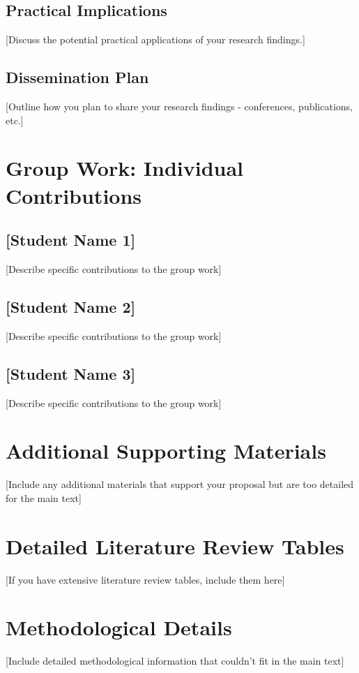 \documentclass[12pt,a4paper]{article}
\begin{document}
\subsection{Practical Implications}
[Discuss the potential practical applications of your research findings.]

\subsection{Dissemination Plan}
[Outline how you plan to share your research findings - conferences, publications, etc.]


\clearpage

\section*{Group Work: Individual Contributions}
\label{sec:contributions}

\subsection*{[Student Name 1]}
[Describe specific contributions to the group work]

\subsection*{[Student Name 2]}
[Describe specific contributions to the group work]

\subsection*{[Student Name 3]}
[Describe specific contributions to the group work]

\clearpage
{}
\printbibliography

\clearpage

\begin{appendices}
\section{Additional Supporting Materials}
[Include any additional materials that support your proposal but are too detailed for the main text]

\section{Detailed Literature Review Tables}
[If you have extensive literature review tables, include them here]

\section{Methodological Details}
[Include detailed methodological information that couldn't fit in the main text]

\end{appendices}
\end{document}
